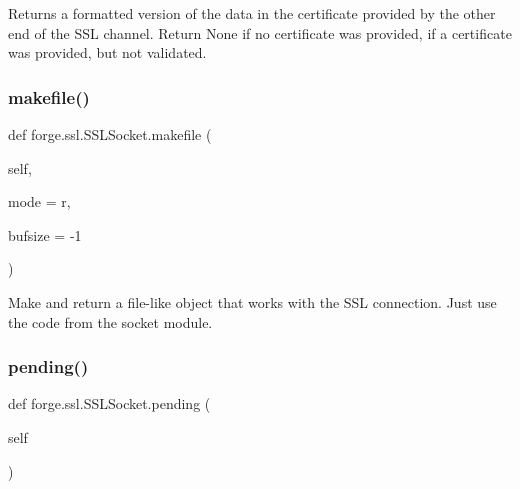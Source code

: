 \begin{DoxyVerb}Returns a formatted version of the data in the
certificate provided by the other end of the SSL channel.
Return None if no certificate was provided, {} if a
certificate was provided, but not validated.\end{DoxyVerb}
 \mbox{\label{classforge_1_1ssl_1_1_s_s_l_socket_a837441ff1f9d4a42537e9948c1762b03}} 
\subsubsection{\texorpdfstring{makefile()}{makefile()}}
{\footnotesize\ttfamily def forge.\+ssl.\+S\+S\+L\+Socket.\+makefile (\begin{DoxyParamCaption}\item[{}]{self,  }\item[{}]{mode = {\ttfamily \textquotesingle{}r\textquotesingle{}},  }\item[{}]{bufsize = {\ttfamily -\/1} }\end{DoxyParamCaption})}

\begin{DoxyVerb}Make and return a file-like object that
works with the SSL connection.  Just use the code
from the socket module.\end{DoxyVerb}
 \mbox{\label{classforge_1_1ssl_1_1_s_s_l_socket_a0b6d75de12bff0e99387f6c320a4f80b}} 
\subsubsection{\texorpdfstring{pending()}{pending()}}
{\footnotesize\ttfamily def forge.\+ssl.\+S\+S\+L\+Socket.\+pending (\begin{DoxyParamCaption}\item[{}]{self }\end{DoxyParamCaption})}

\mbox{\label{classforge_1_1ssl_1_1_s_s_l_socket_a144df4b280e6a4f0663a06482028e201}} 
